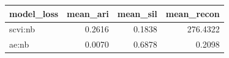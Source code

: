 \begin{tabular}{lrrr}
\toprule
model\_loss & mean\_ari & mean\_sil & mean\_recon \\
\midrule
scvi:nb & 0.2616 & 0.1838 & 276.4322 \\
ae:nb & 0.0070 & 0.6878 & 0.2098 \\
\bottomrule
\end{tabular}
